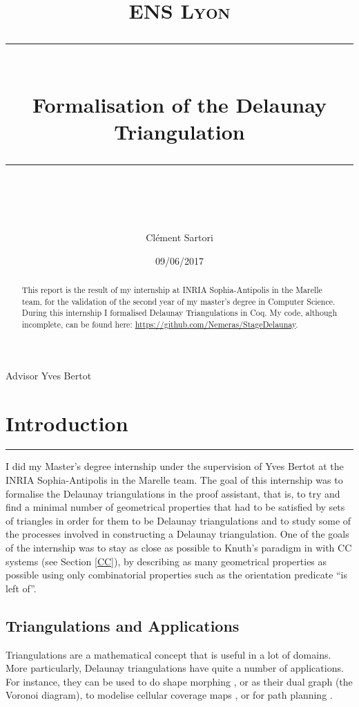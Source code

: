 \documentclass[a4paper,10pt]{article}
\title{
\normalfont \normalsize 
\textsc{ENS Lyon} \\
[10pt] 
\rule{\linewidth}{0.5pt} \\[6pt] 
\huge Formalisation of the Delaunay Triangulation \\
\rule{\linewidth}{2pt}  \\[10pt]
}
\author{Clément Sartori}
\date{\normalsize 09/06/2017}
\begin{document}
\maketitle
\noindent
Advisor \dotfill Yves Bertot \\


\maketitle

\begin{abstract}
  This report is the result of my internship at INRIA Sophia-Antipolis in the Marelle team, for the validation of the second year of my master's degree in Computer Science. During this internship I formalised Delaunay Triangulations in Coq. My code, although incomplete, can be found here: \href{https://github.com/Nemeras/StageDelaunay}{https://github.com/Nemeras/StageDelaunay}.
\end{abstract}

\tableofcontents{}

\newpage

\section{Introduction}
\rule{\linewidth}{0.5pt}

I did my Master's degree internship under the supervision of Yves Bertot at the INRIA Sophia-Antipolis in the Marelle team. 
The goal of this internship was to formalise the Delaunay triangulations in the {} proof assistant, that is, to try and find a minimal number of geometrical properties that had to be satisfied by sets of triangles in order for them to be Delaunay triangulations and to study some of the processes involved in constructing a Delaunay triangulation. One of the goals of the internship was to stay as close as possible to Knuth's paradigm in \cite{Knuth92} with CC systems (see Section \ref{CC}), by describing as many geometrical properties as possible using only combinatorial properties such as the orientation predicate ``is left of''.

\subsection{Triangulations and Applications}
Triangulations are a mathematical concept that is useful in a lot of domains. More particularly, Delaunay triangulations have quite a number of applications. For instance, they can be used to do shape morphing \cite{morphing}, or as their dual graph (the Voronoi diagram),  to modelise cellular coverage maps \cite{CelCov}, or for path planning \cite{PathPla}.
\end{document}
